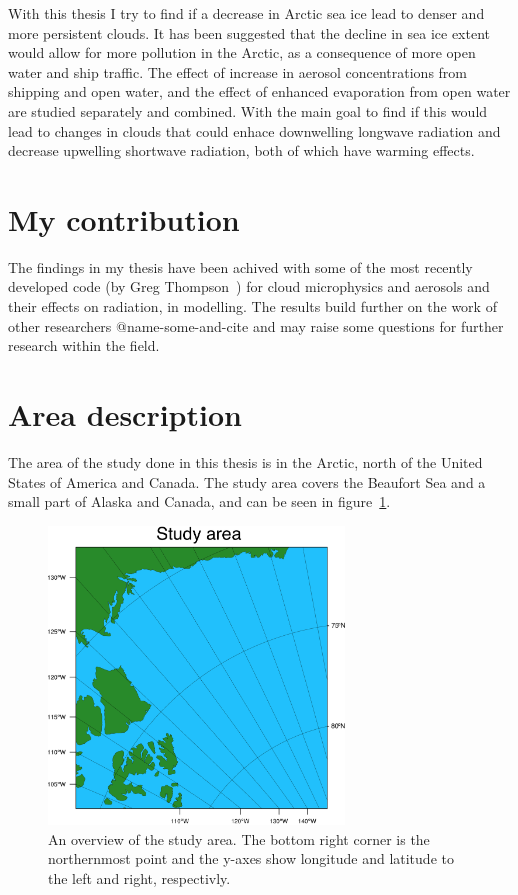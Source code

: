 With this thesis I try to find if a decrease in Arctic sea ice lead to denser and more persistent clouds. It has been suggested that the decline in sea ice extent would allow for more pollution in the Arctic, as a consequence of more open water and ship traffic. The effect of increase in aerosol concentrations from shipping and open water, and the effect of enhanced evaporation from open water are studied separately and combined. With the main goal to find if this would lead to changes in clouds that could enhace downwelling longwave radiation and decrease upwelling shortwave radiation, both of which have warming effects.


\section{My contribution}
The findings in my thesis have been achived with some of the most recently developed code (by Greg Thompson~\citep{Thompson2014}) for cloud microphysics and aerosols and their effects on radiation, in modelling. The results build further on the work of other researchers @name-some-and-cite and may raise some questions for further research within the field.

\section{Area description}
The area of the study done in this thesis is in the Arctic, north of the United States of America and Canada. The study area covers the Beaufort Sea and a small part of Alaska and Canada, and can be seen in figure~\ref{fig:area}.

\begin{figure}
\centering
\includegraphics[width=0.7\textwidth]{introduction/studyarea.png}
\caption{An overview of the study area. The bottom right corner is the northernmost point and the y-axes show longitude and latitude to the left and right, respectivly.}
\label{fig:area}
\end{figure}
 

